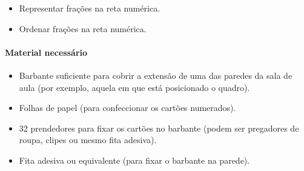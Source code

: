 \anotacoes

\begin{atividade}\label{chap3-ativ11}
\objetivos
\begin{itemize} %
  \item     Representar frações na reta numérica. 
  \item     Ordenar frações na reta numérica.
\end{itemize} %

\paragraph{Material necessário}
\begin{itemize} %
  \item     Barbante suficiente para cobrir a extensão de uma das paredes da sala de aula (por exemplo, aquela em que está posicionado o quadro).
  \item  Folhas de papel (para confeccionar os cartões numerados).
  \item  32 prendedores para fixar os cartões no barbante (podem ser pregadores de roupa, clipes ou mesmo fita adesiva).
  \item     Fita adesiva ou equivalente (para fixar o barbante na parede).
\end{itemize} %


\end{atividade}
